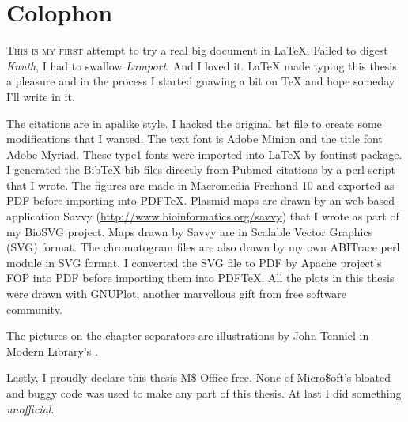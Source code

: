 \chapter{Colophon}

{\scshape This is my first} attempt to try a real big document in
\LaTeX. Failed to digest \textit{Knuth}, I had to swallow
\textit{Lamport}. And I loved it. \LaTeX{} made typing this thesis
a pleasure and in the process I started gnawing a bit on \TeX{}
and hope someday I'll write in it.

The citations are in \textsf{\small apalike} style. I hacked the
original \textsf{\small bst} file to create some modifications
that I wanted. The text font is Adobe Minion and the title font
Adobe Myriad. These type1 fonts were imported into \LaTeX{} by
\textsf{\small fontinst} package. I generated the Bib\TeX{}
\textsf{\small bib} files directly from Pubmed citations by a perl
script that I wrote. The figures are made in Macromedia Freehand
10 and exported as PDF before importing into PDF\TeX. Plasmid maps
are drawn by an web-based application Savvy
({\small\url{http://www.bioinformatics.org/savvy}}) that I wrote
as part of my \textsf{\small BioSVG} project. Maps drawn by Savvy
are in Scalable Vector Graphics (SVG) format. The chromatogram
files are also drawn by my own \textsf{\small ABITrace} perl
module in SVG format. I converted the SVG file to PDF by Apache
project's FOP into PDF before importing them into PDF\TeX{}. All
the plots in this thesis were drawn with GNUPlot, another
marvellous gift from free software community.

The pictures on the chapter separators are illustrations by John
Tenniel in Modern Library's .

Lastly, I proudly declare this thesis M\$ Office free. None of
Micro\$oft's bloated and buggy code was used to make any part of
this thesis. At last I did something \emph{unofficial}. 
